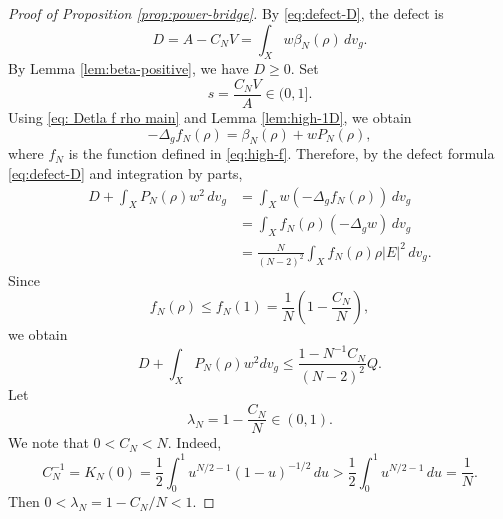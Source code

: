 \documentclass[11pt,letterpaper]{amsart}
\theoremstyle{definition}
\theoremstyle{remark}
\numberwithin{equation}{section}
\begin{document}
\begin{proof}[Proof of Proposition \ref{prop:power-bridge}]
By \eqref{eq:defect-D}, the defect is
\[
 D=A-C_NV=\int_Xw\beta_N(\rho)\,dv_g.
\]
By Lemma \ref{lem:beta-positive}, we have $D\ge0$.  Set
\begin{equation}\label{eq:s-def}
 s=\frac{C_NV}{A}\in(0,1].
\end{equation}
Using \eqref{eq: Detla f rho main} and Lemma \ref{lem:high-1D}, we obtain
\begin{equation}\label{eq:high-Delta-f}
 -\Delta_gf_N(\rho)=\beta_N(\rho)+wP_N(\rho),
\end{equation}
where $f_N$ is the function defined in \eqref{eq:high-f}.
Therefore, by the defect formula \eqref{eq:defect-D} and integration by parts,
\begin{align*}
 D+\int_XP_N(\rho)w^2\,dv_g
 &=\int_Xw(-\Delta_gf_N(\rho))\,dv_g\\
 &=\int_Xf_N(\rho)(-\Delta_gw)\,dv_g\\
 &=\frac{N}{(N-2)^2}\int_Xf_N(\rho)\rho |E|^2\,dv_g.
\end{align*}
Since
\[f_N(\rho) \leq f_N(1)=\frac{1}{N}\left(1-\frac{C_N}{N}\right),\]
we obtain 
\begin{equation}\label{eq: high-pointwise D}
D+\int_X P_N(\rho) w^2 d v_g \leq \frac{1-N^{-1}C_N}{(N-2)^2} Q.
\end{equation}
Let
\[
 \lambda_N=1-\frac{C_N}{N}\in(0,1).
\]
We note that \(0<C_N<N\). Indeed,
\[
  C_N^{-1}
  =
  K_N(0)
  =
  \frac12\int_0^1 u^{N/2-1}(1-u)^{-1/2}\,du
  >
  \frac12\int_0^1 u^{N/2-1}\,du
  =
  \frac1N.
\]
Then \(0<\lambda_N=1-C_N/N<1\).


\end{proof}
\end{document}
